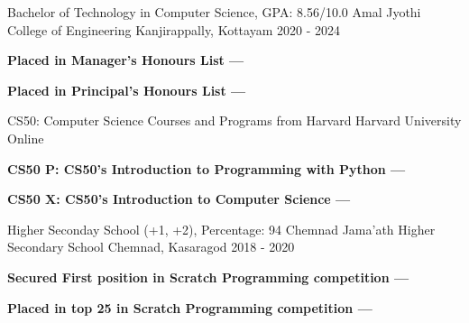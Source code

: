 
\begin{cventries}
  \cventry
    {Bachelor of Technology in Computer Science, GPA: 8.56/10.0} %
    {Amal Jyothi College of Engineering} %
    {Kanjirappally, Kottayam} %
    {2020 - 2024} %
    {
      \begin{cvitems} 
         \item {\textbf{Placed in Manager's Honours List --- }}
         \vspace{1mm}
         \item {\textbf{Placed in Principal's Honours List --- }}
      \end{cvitems}
    }
  \vspace{2mm}
  \cventry
    {CS50: Computer Science Courses and Programs from Harvard} %
    {Harvard University} %
    {Online} %
    {} %
    {
      \begin{cvitems}
         \item {\textbf{CS50 P: CS50's Introduction to Programming with Python --- }}
         \vspace{1mm}
         \item {\textbf{CS50 X: CS50's Introduction to Computer Science --- }}
      \end{cvitems}
    }
  \vspace{2mm}
  \cventry
    {Higher Seconday School (+1, +2), Percentage: 94}
    {Chemnad Jama'ath Higher Secondary School}
    {Chemnad, Kasaragod}
    {2018 - 2020}
    {
      \begin{cvitems} %
         \item {\textbf{Secured First position in Scratch Programming competition --- }}
         \vspace{1mm}
         \item {\textbf{Placed in top 25 in Scratch Programming competition --- }}
      \end{cvitems}
    }
\end{cventries}
